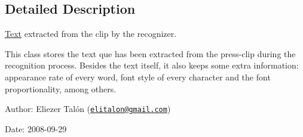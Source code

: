 \subsection{Detailed Description}
\hyperlink{class_text}{Text} extracted from the clip by the recognizer. 

This class stores the text que has been extracted from the press-clip during the recognition process. Besides the text itself, it also keeps some extra information: appearance rate of every word, font style of every character and the font proportionality, among others.

\begin{Desc}
\item[Author:]Eliezer Talón (\href{mailto:elitalon@gmail.com}{\tt elitalon@gmail.com}) \end{Desc}
\begin{Desc}
\item[Date:]2008-09-29 \end{Desc}


